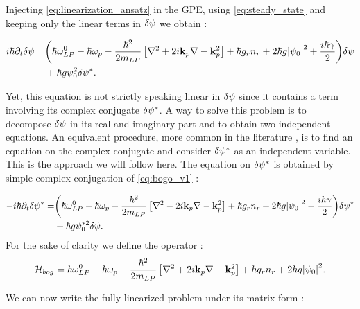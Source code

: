 Injecting \autoref{eq:linearization_ansatz} in the GPE, using \autoref{eq:steady_state} and keeping only the linear terms in $\delta\psi$ we obtain :

\begin{equation}
    \begin{split}
        i  \hbar \partial_t \delta\psi =& \biggl(\hbar\omega_{LP}^0 - \hbar \omega_p-\dfrac{\hbar^2}{2m_{LP}}\left[\nabla^2 +2i\mathbf{k}_p\nabla-\mathbf{k}_p^2\right]+\hbar g_rn_r + 2\hbar g \abs{\psi_0}^2+ \dfrac{i\hbar\gamma}{2} \biggr) \delta\psi \\
                                    &+ \hbar g \psi_0^2 \delta\psi^*. 
    \end{split}
    \label{eq:bogo_v1}
\end{equation}

Yet, this equation is not strictly speaking linear in $\delta\psi$ since it contains a term involving its complex conjugate $\delta\psi^*$. A way to solve this problem
is to decompose $\delta\psi$ in its real and imaginary part and to obtain two independent equations. An equivalent procedure, more common in the literature \cite{pethick_bose-einstein_2008}, is to find an equation on 
the complex conjugate and consider $\delta\psi^*$ as an independent variable. This is the approach we will follow here. The equation on $\delta\psi^*$ is obtained by simple complex conjugation of \autoref{eq:bogo_v1} :

\begin{equation}
    \begin{split}
    -i  \hbar \partial_t \delta\psi^* = &\biggl(\hbar\omega_{LP}^0 - \hbar \omega_p-\dfrac{\hbar^2}{2m_{LP}}\left[\nabla^2 -2i\mathbf{k}_p\nabla-\mathbf{k}_p^2\right]+\hbar g_rn_r + 2\hbar g \abs{\psi_0}^2- \dfrac{i\hbar\gamma}{2}\biggr) \delta\psi^* \\
      &+ \hbar g \psi_0^{*2} \delta\psi.
    \end{split}
    \label{eq:bogo_v2}
\end{equation}
For the sake of clarity we define the operator :
\begin{equation}
    \mathcal{H}_{bog}= \hbar\omega_{LP}^0 - \hbar \omega_p-\dfrac{\hbar^2}{2m_{LP}}\left[\nabla^2 +2i\mathbf{k}_p\nabla-\mathbf{k}_p^2\right]+\hbar g_rn_r + 2\hbar g \abs{\psi_0}^2.
    \label{eq:hambog}
\end{equation}

We can now write the fully linearized problem under its matrix form :

